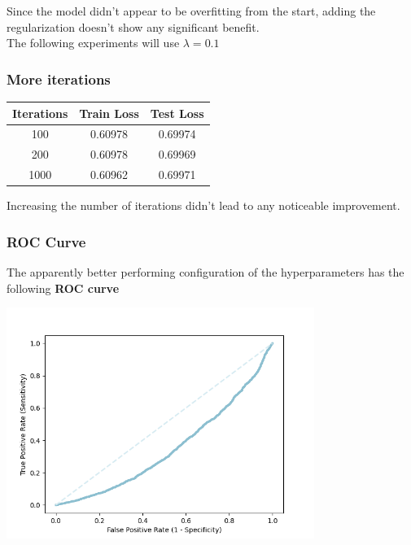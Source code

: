 \documentclass[
	letterpaper, %
	10pt, %
]{class}
\begin{document}
Since the model didn't appear to be overfitting from the start, adding the regularization doesn't show any significant benefit.\\
The following experiments will use $\lambda = 0.1$

\subsubsection{More iterations}

\begin{center}
    \begin{tabular}{ |c|c|c| }
        \hline
        Iterations & Train Loss & Test Loss \\
        \hline
        100        & 0.60978    & 0.69974   \\
        200        & 0.60978    & 0.69969   \\
        1000       & 0.60962    & 0.69971   \\
        \hline
    \end{tabular}
\end{center}

Increasing the number of iterations didn't lead to any noticeable improvement.

\subsubsection{ROC Curve}

The apparently better performing configuration of the hyperparameters has the following \textbf{ROC curve}

\begin{center}
    \includegraphics[width=10cm]{../images/roc_1.png}
\end{center}
\end{document}
